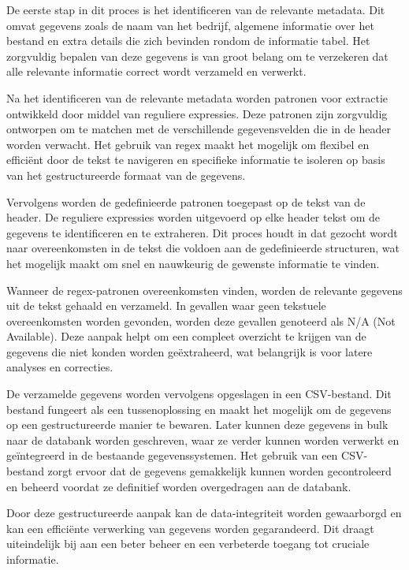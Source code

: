 De eerste stap in dit proces is het identificeren van de relevante metadata. Dit omvat gegevens zoals de naam van het bedrijf, algemene informatie over het bestand en extra details die zich bevinden rondom de informatie tabel. Het zorgvuldig bepalen van deze gegevens is van groot belang om te verzekeren dat alle relevante informatie correct wordt verzameld en verwerkt.

Na het identificeren van de relevante metadata worden patronen voor extractie ontwikkeld door middel van reguliere expressies. Deze patronen zijn zorgvuldig ontworpen om te matchen met de verschillende gegevensvelden die in de header worden verwacht. Het gebruik van regex maakt het mogelijk om flexibel en efficiënt door de tekst te navigeren en specifieke informatie te isoleren op basis van het gestructureerde formaat van de gegevens.



Vervolgens worden de gedefinieerde patronen toegepast op de tekst van de header. De reguliere expressies worden uitgevoerd op elke header tekst om de gegevens te identificeren en te extraheren. Dit proces houdt in dat gezocht wordt naar overeenkomsten in de tekst die voldoen aan de gedefinieerde structuren, wat het mogelijk maakt om snel en nauwkeurig de gewenste informatie te vinden.



Wanneer de regex-patronen overeenkomsten vinden, worden de relevante gegevens uit de tekst gehaald en verzameld. In gevallen waar geen tekstuele overeenkomsten worden gevonden, worden deze gevallen genoteerd als N/A (Not Available). Deze aanpak helpt om een compleet overzicht te krijgen van de gegevens die niet konden worden geëxtraheerd, wat belangrijk is voor latere analyses en correcties.

De verzamelde gegevens worden vervolgens opgeslagen in een CSV-bestand. Dit bestand fungeert als een tussenoplossing en maakt het mogelijk om de gegevens op een gestructureerde manier te bewaren. Later kunnen deze gegevens in bulk naar de databank worden geschreven, waar ze verder kunnen worden verwerkt en geïntegreerd in de bestaande gegevenssystemen. Het gebruik van een CSV-bestand zorgt ervoor dat de gegevens gemakkelijk kunnen worden gecontroleerd en beheerd voordat ze definitief worden overgedragen aan de databank.

Door deze gestructureerde aanpak kan de data-integriteit worden gewaarborgd en kan een efficiënte verwerking van gegevens worden gegarandeerd. Dit draagt uiteindelijk bij aan een beter beheer en een verbeterde toegang tot cruciale informatie.




